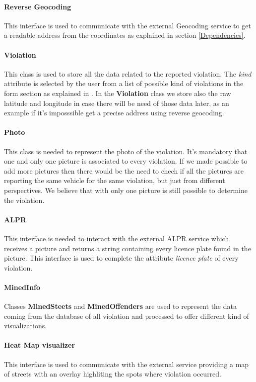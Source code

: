 \paragraph{Reverse Geocoding}
This interface is used to communicate with the external Geocoding service to get a readable address from the coordinates as explained in section \ref{Dependencies}.

\paragraph{Violation}
This class is used to store all the data related to the reported violation. The \textit{kind} attribute is selected by the user from a list of possible kind of violations in the form section as explained in .  In the \textbf{Violation} class we store also the raw latitude and longitude in case there will be need of those data later, as an example if it's imposssible get a precise address using reverse geocoding.

\paragraph{Photo}
This class is needed to represent the photo of the violation. It's mandatory that one and only one picture is associated to every violation. If we made possible to add more pictures then there would be the need to chech if all the pictures are reporting the same vehicle for the same violation, but just from different perspectives. We believe that with only one picture is still possible to determine the violation.

\paragraph{ALPR}
This interface is needed to interact with the external ALPR service which receives a picture and returns a string containing every licence plate found in the picture. This interface is used to complete the attribute \textit{licence plate} of every violation.

\paragraph{MinedInfo}
Classes \textbf{MinedSteets} and \textbf{MinedOffenders} are used to represent the data coming from the database of all violation and processed to offer different kind of visualizations.

\paragraph{Heat Map visualizer}
This interface is used to communicate with the external service providing a map of streets with an overlay highliting the spots where violation occurred.

